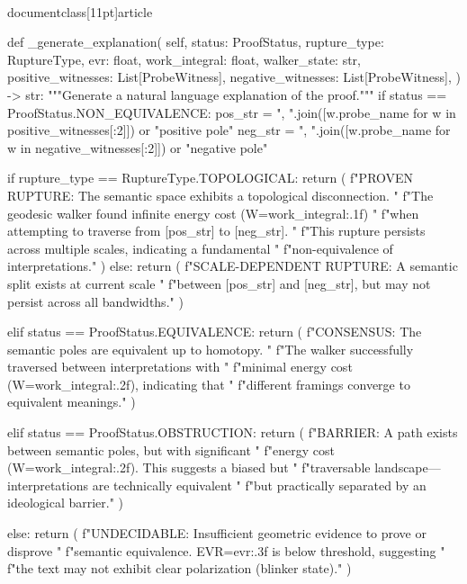 \\documentclass[11pt]{article}
\begin{document}
\begin{CodeBlock}
    def _generate_explanation(
        self,
        status: ProofStatus,
        rupture_type: RuptureType,
        evr: float,
        work_integral: float,
        walker_state: str,
        positive_witnesses: List[ProbeWitness],
        negative_witnesses: List[ProbeWitness],
    ) -> str:
        """Generate a natural language explanation of the proof."""
        if status == ProofStatus.NON_EQUIVALENCE:
            pos_str = ", ".join([w.probe_name for w in positive_witnesses[:2]]) or "positive pole"
            neg_str = ", ".join([w.probe_name for w in negative_witnesses[:2]]) or "negative pole"

            if rupture_type == RuptureType.TOPOLOGICAL:
                return (
                    f"PROVEN RUPTURE: The semantic space exhibits a topological disconnection. "
                    f"The geodesic walker found infinite energy cost (W={work_integral:.1f}) "
                    f"when attempting to traverse from [{pos_str}] to [{neg_str}]. "
                    f"This rupture persists across multiple scales, indicating a fundamental "
                    f"non-equivalence of interpretations."
                )
            else:
                return (
                    f"SCALE-DEPENDENT RUPTURE: A semantic split exists at current scale "
                    f"between [{pos_str}] and [{neg_str}], but may not persist across all bandwidths."
                )

        elif status == ProofStatus.EQUIVALENCE:
            return (
                f"CONSENSUS: The semantic poles are equivalent up to homotopy. "
                f"The walker successfully traversed between interpretations with "
                f"minimal energy cost (W={work_integral:.2f}), indicating that "
                f"different framings converge to equivalent meanings."
            )

        elif status == ProofStatus.OBSTRUCTION:
            return (
                f"BARRIER: A path exists between semantic poles, but with significant "
                f"energy cost (W={work_integral:.2f}). This suggests a biased but "
                f"traversable landscape—interpretations are technically equivalent "
                f"but practically separated by an ideological barrier."
            )

        else:
            return (
                f"UNDECIDABLE: Insufficient geometric evidence to prove or disprove "
                f"semantic equivalence. EVR={evr:.3f} is below threshold, suggesting "
                f"the text may not exhibit clear polarization (blinker state)."
            )


\end{CodeBlock}
\end{document}
